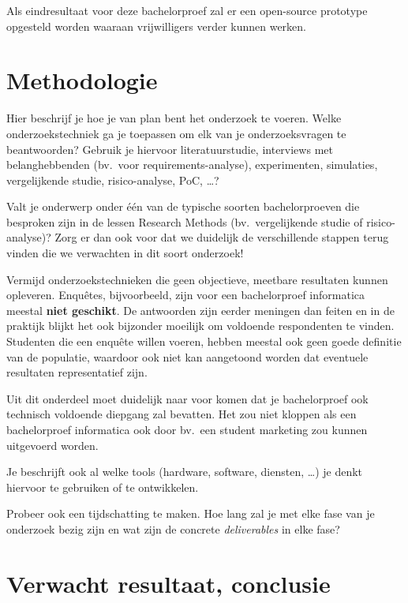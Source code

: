 Als eindresultaat voor deze bachelorproef zal er een open-source prototype opgesteld worden waaraan vrijwilligers verder kunnen werken.


\section{Methodologie}%
\label{sec:methodologie}

Hier beschrijf je hoe je van plan bent het onderzoek te voeren. Welke onderzoekstechniek ga je toepassen om elk van je onderzoeksvragen te beantwoorden? Gebruik je hiervoor literatuurstudie, interviews met belanghebbenden (bv.~voor requirements-analyse), experimenten, simulaties, vergelijkende studie, risico-analyse, PoC, \ldots?

Valt je onderwerp onder één van de typische soorten bachelorproeven die besproken zijn in de lessen Research Methods (bv.\ vergelijkende studie of risico-analyse)? Zorg er dan ook voor dat we duidelijk de verschillende stappen terug vinden die we verwachten in dit soort onderzoek!

Vermijd onderzoekstechnieken die geen objectieve, meetbare resultaten kunnen opleveren. Enquêtes, bijvoorbeeld, zijn voor een bachelorproef informatica meestal \textbf{niet geschikt}. De antwoorden zijn eerder meningen dan feiten en in de praktijk blijkt het ook bijzonder moeilijk om voldoende respondenten te vinden. Studenten die een enquête willen voeren, hebben meestal ook geen goede definitie van de populatie, waardoor ook niet kan aangetoond worden dat eventuele resultaten representatief zijn.

Uit dit onderdeel moet duidelijk naar voor komen dat je bachelorproef ook technisch voldoen\-de diepgang zal bevatten. Het zou niet kloppen als een bachelorproef informatica ook door bv.\ een student marketing zou kunnen uitgevoerd worden.

Je beschrijft ook al welke tools (hardware, software, diensten, \ldots) je denkt hiervoor te gebruiken of te ontwikkelen.

Probeer ook een tijdschatting te maken. Hoe lang zal je met elke fase van je onderzoek bezig zijn en wat zijn de concrete \emph{deliverables} in elke fase?

\section{Verwacht resultaat, conclusie}%
\label{sec:verwachte_resultaten}

